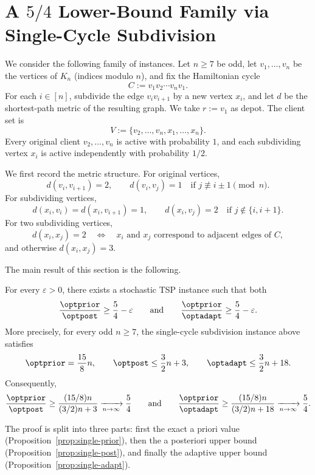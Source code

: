 \section{A \texorpdfstring{$5/4$}{5/4} Lower-Bound Family via Single-Cycle Subdivision}\label{sec:single-cycle}

We consider the following family of instances. Let $n\ge 7$ be odd, let $v_1,\dots,v_n$ be the vertices of $K_n$ (indices modulo $n$), and fix the Hamiltonian cycle
\[
C:=v_1v_2\cdots v_nv_1.
\]
For each $i\in[n]$, subdivide the edge $v_iv_{i+1}$ by a new vertex $x_i$, and let $d$ be the shortest-path metric of the resulting graph. We take $r:=v_1$ as depot. The client set is
\[
V:=\{v_2,\dots,v_n,x_1,\dots,x_n\}.
\]
Every original client $v_2,\dots,v_n$ is active with probability $1$, and each subdividing vertex $x_i$ is active independently with probability $1/2$.

We first record the metric structure. For original vertices,
\[
d(v_i,v_{i+1})=2,
\qquad
 d(v_i,v_j)=1\quad\text{if } j\not\equiv i\pm 1 \pmod n.
\]
For subdividing vertices,
\[
d(x_i,v_i)=d(x_i,v_{i+1})=1,
\qquad
 d(x_i,v_j)=2\quad\text{if } j\notin\{i,i+1\}.
\]
For two subdividing vertices,
\[
d(x_i,x_j)=2
\quad\Longleftrightarrow\quad
x_i\text{ and }x_j\text{ correspond to adjacent edges of }C,
\]
and otherwise $d(x_i,x_j)=3$.

The main result of this section is the following.

\begin{theorem}\label{thm:single-cycle-main}
For every $\varepsilon>0$, there exists a stochastic TSP instance such that both
\[
\frac{\optprior}{\optpost}\ge \frac54-\varepsilon
\qquad\text{and}\qquad
\frac{\optprior}{\optadapt}\ge \frac54-\varepsilon.
\]
More precisely, for every odd $n\ge 7$, the single-cycle subdivision instance above satisfies
\[
\optprior=\frac{15}{8}n,
\qquad
\optpost\le \frac32 n+3,
\qquad
\optadapt\le \frac32 n+18.
\]
Consequently,
\[
\frac{\optprior}{\optpost}
\ge
\frac{(15/8)n}{(3/2)n+3}
\xrightarrow[n\to\infty]{} \frac54
\qquad\text{and}\qquad
\frac{\optprior}{\optadapt}
\ge
\frac{(15/8)n}{(3/2)n+18}
\xrightarrow[n\to\infty]{} \frac54.
\]
\end{theorem}

The proof is split into three parts: first the exact a priori value (Proposition~\ref{prop:single-prior}), then the a posteriori upper bound (Proposition~\ref{prop:single-post}), and finally the adaptive upper bound (Proposition~\ref{prop:single-adapt}).

